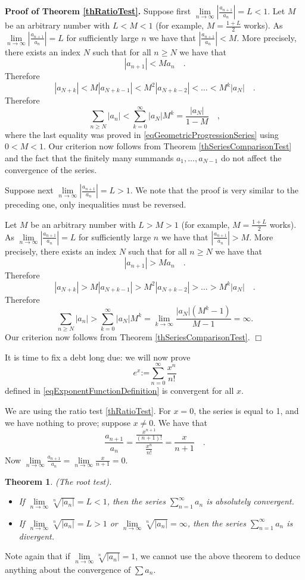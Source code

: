 \documentclass[12pt]{book}
\newcommand{\eqdef}{\textbf{:=}}
\newenvironment{proof}[1][]{ \textbf{Proof#1.} }{$\Box$\medskip}
\newtheorem{theorem}{Theorem}[section]
\begin{document}
\begin{proof}[ of Theorem \ref{thRatioTest}] 
Suppose first $\lim\limits_{n\to\infty}\left|\frac{a_{n+1}}{a_{n}}\right|= L<1 $. Let $M$ be an arbitrary number with $L<M<1$ (for example, $M=\frac{1+L}2$ works). As $\lim\limits_{n\to\infty}\left|\frac{a_{n+1}}{a_{n}}\right|=L$ for sufficiently large $n$ we have that $\left|\frac{a_{n+1}}{a_{n}} \right|< M$. More precisely, there exists an index $N$ such that for all $n\geq N$ we have that
\[
|a_{n+1}|< Ma_{n}\quad .
\]
Therefore 
\[
|a_{N+k}|<M |a_{N+k-1}|< M^2 |a_{N+k-2}|<\dots <M^k |a_N|\quad .
\]
Therefore 
\[
\sum_{n\geq N} |a_{n}|<\sum_{k=0}^{\infty} |a_N|M^{k}= \frac{|a_N|}{1-M}\quad ,
\] 
where the last equality was proved in \eqref{eqGeometricProgressionSeries} using $0<M<1$. Our criterion now follows from Theorem \ref{thSeriesComparisonTest} and the fact that the finitely many summands $a_1, \dots, a_{N-1}$ do not affect the convergence of the series.

Suppose next $\lim\limits_{n\to\infty}\left|\frac{a_{n+1}}{a_{n}}\right|= L>1 $. We note that the proof is very similar to the preceding one, only inequalities must be reversed.

Let $M$ be an arbitrary number with $L>M>1$ (for example, $M=\frac{1+L}2$ works). As $\lim\limits_{n\to\infty} \left| \frac{a_{n+1}}{a_{n}} \right|=L$ for sufficiently large $n$ we have that $\left|\frac{a_{n+1}}{a_{n}} \right|> M$. More precisely, there exists an index $N$ such that for all $n\geq N$ we have that
\[
|a_{n+1}|> Ma_{n}\quad .
\]
Therefore 
\[
|a_{N+k}|>M |a_{N+k-1}|> M^2 |a_{N+k-2}|>\dots >M^k |a_N|\quad .
\]
Therefore 
\[
\sum_{n\geq N} |a_{n}|>\sum_{k=0}^{\infty} |a_N|M^{k}= \lim_{k\to \infty} \frac{|a_N|(M^k-1)}{M-1}=\infty.
\] 
Our criterion now follows from Theorem \ref{thSeriesComparisonTest}.
\end{proof}

 It is time to fix a debt long due: we will now prove 
\[
e^x\eqdef \sum_{n=0}^\infty \frac{x^n}{n!} 
\]
defined in \ref{eqExponentFunctionDefinition} is convergent for all $x$. 

We are using the ratio test \ref{thRatioTest}. For $x=0$, the series is equal to 1, and we have nothing to prove; suppose $x\neq 0$.  We have that 
\[
\frac{a_{n+1}}{a_{n}}= \frac{\frac{x^{n+1}}{(n+1)!}}{\frac{x^{n}}{n!}} = \frac{x}{n+1}\quad .
\]
Now $\lim\limits_{n\to \infty} \frac{a_{n+1}}{a_{n}}= \lim\limits_{n\to \infty} \frac{x}{n+1}=0$.

\begin{theorem}\label{thRootTest}(The root test). 
\begin{itemize}
\item If $\lim\limits_{n\to\infty}\sqrt[n]{|a_n|}= L<1$, then the series $\sum\limits_{n=1}^\infty a_n$ is absolutely convergent.
\item If $\lim\limits_{n\to\infty}\sqrt[n]{|a_n|}= L>1$ or $\lim\limits_{n\to\infty}\sqrt[n]{|a_n|}=\infty$, then the series $\sum\limits_{n=1}^\infty a_n$ is divergent.
\end{itemize}
\end{theorem}
Note again that if $\lim\limits_{n\to\infty}\sqrt[n]{|a_n|}= 1$, we cannot use the above theorem to deduce anything about the convergence of $\sum a_n$.
\end{document}
